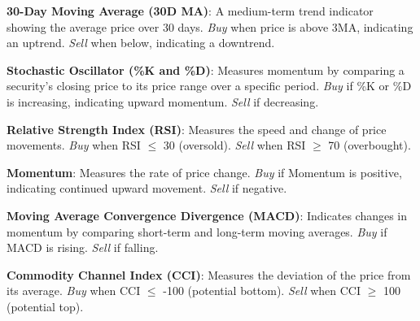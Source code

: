 \documentclass{article}
\begin{document}
\textbf{30-Day Moving Average (30D MA)}: A medium-term trend indicator showing the average price over 30 days. \textit{Buy} when price is above 3MA, indicating an uptrend. \textit{Sell} when below, indicating a downtrend.

\textbf{Stochastic Oscillator (\%K and \%D)}: Measures momentum by comparing a security's closing price to its price range over a specific period. \textit{Buy} if \%K or \%D is increasing, indicating upward momentum. \textit{Sell} if decreasing.

\textbf{Relative Strength Index (RSI)}: Measures the speed and change of price movements. \textit{Buy} when RSI $\leq$ 30 (oversold). \textit{Sell} when RSI $\geq$ 70 (overbought).

\textbf{Momentum}: Measures the rate of price change. \textit{Buy} if Momentum is positive, indicating continued upward movement. \textit{Sell} if negative.

\textbf{Moving Average Convergence Divergence (MACD)}: Indicates changes in momentum by comparing short-term and long-term moving averages. \textit{Buy} if MACD is rising. \textit{Sell} if falling.

\textbf{Commodity Channel Index (CCI)}: Measures the deviation of the price from its average. \textit{Buy} when CCI $\leq$ -100 (potential bottom). \textit{Sell} when CCI $\geq$ 100 (potential top).
\end{document}
